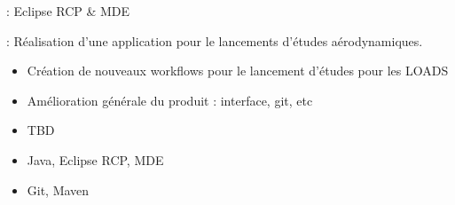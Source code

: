 
 : Eclipse RCP \& MDE

 : Réalisation d'une application pour le lancements d'études aérodynamiques.

\bigskip


\begin{itemize}
\item Création de nouveaux workflows pour le lancement d'études pour les LOADS
\item Amélioration générale du produit : interface, git, etc
\end{itemize} 


\begin{itemize}
\item TBD
\end{itemize} 


\begin{itemize}
\item Java, Eclipse RCP, MDE
\item Git, Maven
\end{itemize} 